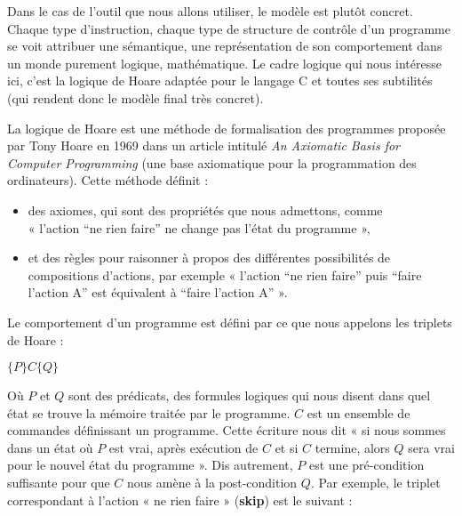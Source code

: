 Dans le cas de l'outil que nous allons utiliser, le modèle est plutôt concret. 
Chaque type d'instruction, chaque type de structure de contrôle d'un programme 
se voit attribuer une sémantique, une représentation de son comportement dans 
un monde purement logique, mathématique. Le cadre logique qui nous intéresse 
ici, c'est la logique de Hoare adaptée pour le langage C et toutes ses 
subtilités (qui rendent donc le modèle final très concret).








La logique de Hoare est une méthode de formalisation des programmes proposée 
par Tony Hoare en 1969 dans un article intitulé \textit{An Axiomatic Basis for 
Computer Programming} (une base axiomatique pour la programmation des 
ordinateurs). Cette méthode définit :



\begin{itemize}
\item des axiomes, qui sont des propriétés que nous admettons, comme \\
« l'action “ne rien faire” ne change pas l'état du programme »,
\item et des règles pour raisonner à propos des différentes possibilités de 
compositions d'actions, par exemple « l'action “ne rien faire” puis “faire 
l'action A” est équivalent à “faire l'action A” ».
\end{itemize}


Le comportement d'un programme est défini par ce que nous appelons les triplets
de Hoare :




\begin{center}
$\{P\} C \{Q\}$


\end{center}


Où $P$ et $Q$ sont des prédicats, des formules logiques qui nous disent dans 
quel état se trouve la mémoire traitée par le programme. $C$ est un ensemble de
commandes définissant un programme. Cette écriture nous dit « si nous sommes 
dans un état où $P$ est vrai, après exécution de $C$ et si $C$ termine, 
alors $Q$ sera vrai pour le nouvel état du programme ». Dis autrement, $P$ est 
une pré-condition suffisante pour que $C$ nous amène à la post-condition $Q$. 
Par exemple, le triplet correspondant à l'action « ne rien faire » (\textbf{skip}) 
est le suivant :




